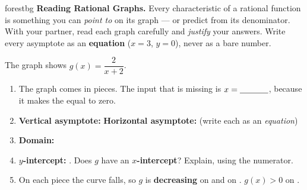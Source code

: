 \documentclass[10pt]{article}
\newcommand{\lgrid}[4]{%
  \draw[step=1, linegray!40, very thin] (#1,#3) grid (#2,#4);
  \draw[->, semithick, charcoal] (#1,0)--(#2,0) node[below right, font=\scriptsize]{$x$};
  \draw[->, semithick, charcoal] (0,#3)--(0,#4) node[left, font=\scriptsize]{$y$};}
\begin{document}
\namepartnerperiod

\vspace{0.08in}

\begin{headlinebox}{forestbg}
\small\textbf{Reading Rational Graphs.} Every characteristic of a rational function is something you
can \emph{point to} on its graph --- or predict from its denominator. With your partner, read each
graph carefully and \emph{justify} your answers. Write every asymptote as an \textbf{equation}
($x=3$, $y=0$), never as a bare number.
\end{headlinebox}

\vspace{0.06in}

\begin{tcolorbox}[colback=white, colframe=black!40, title=\textbf{Tier R --- Remediate},
    fonttitle=\bfseries, arc=1.5mm, left=3mm, right=3mm, top=2mm, bottom=2mm, breakable]
The graph shows $g(x) = \dfrac{2}{x+2}$.
\begin{center}
\end{center}
\begin{enumerate}[leftmargin=1.7em, itemsep=7pt]
  \item The graph comes in \blank{1.0cm} pieces. The input that is missing is $x=\blank{1.2cm}$,
        because it makes the \blank{3.0cm} equal to zero.
  \item \textbf{Vertical asymptote:} \blank{2.0cm} \quad \textbf{Horizontal asymptote:}
        \blank{2.0cm} \quad (write each as an \emph{equation})
  \item \textbf{Domain:} \blank{6.0cm}
  \item \textbf{$y$-intercept:} \blank{1.8cm}. \quad Does $g$ have an \textbf{$x$-intercept}?
        \blank{1.2cm} \; Explain, using the numerator. \blank{5.4cm}
  \item On each piece the curve falls, so $g$ is \textbf{decreasing} on \blank{2.4cm} and on
        \blank{2.4cm}. \quad $g(x)>0$ on \blank{2.4cm}.
\end{enumerate}
\end{tcolorbox}
\end{document}
